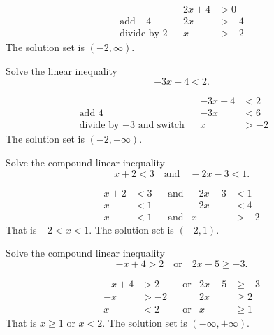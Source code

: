 \documentclass[en,11pt]{latex/elegantbookr}
\theoremstyle{definition}
\theoremstyle{definition}
\theoremstyle{definition}
\theoremstyle{remark}
\let\BeginKnitrBlock\begin \let\EndKnitrBlock\end
\begin{document}
\BeginKnitrBlock{solution}
{}\[
\begin{aligned}
&  & 2x+4 & >0  \\
    \text{add $-4$}      &  & 2x   & >-4 \\
    \text{divide by $2$} &  & x    & >-2
\end{aligned}
\]
The solution set is \((-2, \infty)\).
\EndKnitrBlock{solution}

\BeginKnitrBlock{example}
\protect\hypertarget{exm:unnamed-chunk-8}{}{\label{exm:unnamed-chunk-8} }Solve the linear inequality
\[
-3x-4<2.
\]
\EndKnitrBlock{example}

\BeginKnitrBlock{solution}
{}\[
\begin{aligned}
                                        &  & -3x-4 & <2       \\
    \text{add $4$}                   &  & -3x   & <6  &  & \\
    \text{divide by $-3$ and switch} &  & x     & >-2
\end{aligned}
\]
The solution set is \((-2, +\infty)\).
\EndKnitrBlock{solution}

\BeginKnitrBlock{example}
\protect\hypertarget{exm:unnamed-chunk-10}{}{\label{exm:unnamed-chunk-10} }Solve the compound linear inequality
\[
x+2<3\quad \text{and}\quad -2x-3<1.
\]
\EndKnitrBlock{example}

\BeginKnitrBlock{solution}
{}\[
\begin{aligned}
    x+2 & <3 &  & \text{and} & -2x-3 & <1  \\
    x   & <1 &  &            & -2x   & <4  \\
    x   & <1 &  & \text{and} & x     & >-2
\end{aligned}
\]
That is \(-2<x<1\). The solution set is \((-2, 1)\).
\EndKnitrBlock{solution}

\BeginKnitrBlock{example}
\protect\hypertarget{exm:unnamed-chunk-12}{}{\label{exm:unnamed-chunk-12} }Solve the compound linear inequality\\
\[
-x+4>2 \quad \text{or} \quad 2x-5\geq -3.
\]
\EndKnitrBlock{example}

\BeginKnitrBlock{solution}
{}\[
\begin{aligned}
    -x+4 & >2  &  & \text{or} & 2x-5 & \geq -3 \\
    -x   & >-2 &  &           & 2x   & \geq 2  \\
    x    & <2  &  & \text{or} & x    & \geq 1
\end{aligned}
\]
That is \(x\geq 1\) or \(x< 2\). The solution set is \((-\infty, +\infty)\).
\EndKnitrBlock{solution}
\end{document}
